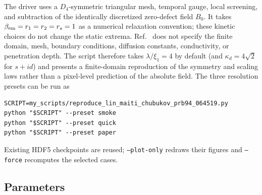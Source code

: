 \documentclass[11pt]{article}
\begin{document}
The driver uses a $D_4$-symmetric triangular mesh, temporal gauge, local
screening, and subtraction of the identically discretized zero-defect field
$B_0$.  It takes $\beta_{\rm em}=r_1=r_2=r_s=1$ as a numerical relaxation
convention; these kinetic choices do not change the static extrema.
Ref.~\cite{Lin2016} does not specify the finite domain, mesh, boundary
conditions, diffusion constants, conductivity, or penetration depth.  The
script therefore takes $\lambda/\xi_1=4$ by default (and
$\kappa_d=4\sqrt2$ for $s+id$) and presents a finite-domain reproduction of
the symmetry and scaling laws rather than a pixel-level prediction of the
absolute field.  The three resolution presets can be run as
\begin{verbatim}
SCRIPT=my_scripts/reproduce_lin_maiti_chubukov_prb94_064519.py
python "$SCRIPT" --preset smoke
python "$SCRIPT" --preset quick
python "$SCRIPT" --preset paper
\end{verbatim}
Existing HDF5 checkpoints are reused; \texttt{--plot-only} redraws their
figures and \texttt{--force} recomputes the selected cases.

\subsection{Parameters}
\end{document}

